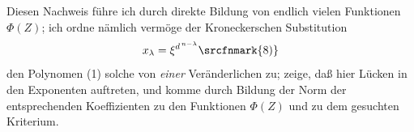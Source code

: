 Diesen Nachweis führe ich durch direkte Bildung von endlich vielen Funktionen $\Phi(Z)$; ich ordne nämlich vermöge der Kroneckerschen Substitution
\[
 x_\lambda=\xi^{d^{\,n-\lambda}}\text{\srcfnmark{8)}}
\]
den Polynomen (1) solche von \emph{einer} Veränderlichen zu; zeige, daß hier Lücken in den Exponenten auftreten, und komme durch Bildung der Norm der entsprechenden Koeffizienten zu den Funktionen $\Phi(Z)$ und zu dem gesuchten Kriterium.

\addtocounter{footnote}{1}

